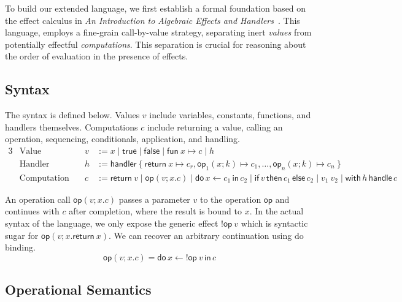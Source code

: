 \documentclass{article}
\theoremstyle{definition}
\theoremstyle{remark}
\newcommand\true{\mathsf{true}}
\newcommand\false{\mathsf{false}}
\newcommand\fun[2]{{\mathsf{fun} \ #1 \mapsto #2}}
\newcommand\handler[1]{{\mathsf{handler} \ \{ \ #1 \ \}}}
\newcommand\ret[1]{{\mathsf{return} \ #1}}
\newcommand\op{\mathsf{op}}
\newcommand{\doin}[3]{\mathsf{do}\, #1 \leftarrow #2\, \mathsf{in}\, #3}
\newcommand{\ifelse}[3]{\mathsf{if}\, #1 \,\mathsf{then} \,#2\, \mathsf{else}\, #3}
\newcommand{\with}[2]{\mathsf{with}\, #1 \,\mathsf{handle} \,#2}
\newcommand{\app}[2]{{#1 \ #2}}
\newcommand\eff{{!}}
\begin{document}
To build our extended language, we first establish a formal foundation based on the effect calculus in \emph{An Introduction to Algebraic Effects and Handlers}~\cite{pretnar_introduction_2015}.
This language, employs a fine-grain call-by-value strategy, separating inert \emph{values} from potentially effectful \emph{computations}.
This separation is crucial for reasoning about the order of evaluation in the presence of effects.

\subsection{Syntax}

The syntax is defined below. Values $v$ include variables, constants, functions, and handlers themselves.
Computations $c$ include returning a value, calling an operation, sequencing, conditionals, application, and handling.
\begin{alignat*}{3}
  &\text{Value} \quad & v &:= x \mid \true \mid \false \mid \fun x c \mid h \\
  &\text{Handler} \quad & h &:= \handler{ \ret{x} \mapsto c_r, \op_1(x;k) \mapsto c_1, \dots, \op_n(x;k) \mapsto c_n } \\
  &\text{Computation} \quad & c &:= \ret{v} \mid \op(v; x.c) \mid \doin{x}{c_1}{c_2} \mid \ifelse{v}{c_1}{c_2} \mid \app{v_1}{v_2} \mid \with{h}{c}
\end{alignat*}

An operation call $\op(v; x.c)$ passes a parameter $v$ to the operation $\op$ and continues with $c$ after completion, where the result is bound to $x$.
In the actual syntax of the language, we only expose the generic effect $\eff\op \ v$ which is syntactic sugar for $\op(v; x.\ret{x})$.
We can recover an arbitrary continuation using do binding.
\[
  \op(v; x.c) = \doin{x}{\eff\op \ v}{c}
\]

\subsection{Operational Semantics}
\end{document}

